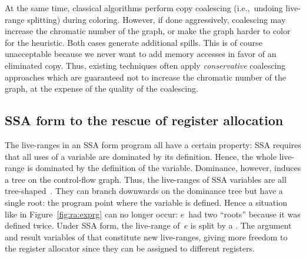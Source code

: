 {At the same time, classical algorithms perform copy coalescing (i.e.,~undoing live-range splitting) during coloring.
However, if done aggressively, coalescing may increase the chromatic number of the graph, or make the graph harder to color for the heuristic.
Both cases generate additional spills.
This is of course unacceptable because we never want to add memory accesses in favor of an eliminated copy.
Thus, existing techniques often apply \emph{conservative} coalescing approaches which are guaranteed not to increase the chromatic number of the graph, at the expense of the quality of the coalescing.

\subsection{SSA form to the rescue of register allocation}

The live-ranges in an SSA form program all have a certain property:
SSA requires that all uses of a variable are dominated by its definition.
Hence, the whole live-range is dominated by the definition of the variable.
Dominance, however, induces a tree on the control-flow graph.
Thus, the live-ranges of SSA variables are all tree-shaped~\cite{Bouchez05:RR,brisk:2006:poly,HGG:2006:RA_SSA}.
They can branch downwards on the dominance tree but have a single root:
the program point where the variable is defined.
Hence a situation like in Figure~\ref{fig:ra:exprg} can no longer occur:
$e$~had two ``roots'' because it was defined twice.
Under SSA form, the live-range of~$e$ is split by a \phifun.
The argument and result variables of that \phifun constitute new live-ranges, giving more freedom to the register allocator since they can be assigned to different registers.

}
